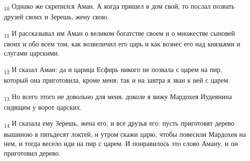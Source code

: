 \begin{tcolorbox}
\textsubscript{10} Однако же скрепился Аман. А когда пришел в дом свой, то послал позвать друзей своих и Зерешь, жену свою.
\end{tcolorbox}
\begin{tcolorbox}
\textsubscript{11} И рассказывал им Аман о великом богатстве своем и о множестве сыновей своих и обо всем том, как возвеличил его царь и как вознес его над князьями и слугами царскими.
\end{tcolorbox}
\begin{tcolorbox}
\textsubscript{12} И сказал Аман: да и царица Есфирь никого не позвала с царем на пир, который она приготовила, кроме меня; так и на завтра я зван к ней с царем.
\end{tcolorbox}
\begin{tcolorbox}
\textsubscript{13} Но всего этого не довольно для меня, доколе я вижу Мардохея Иудеянина сидящим у ворот царских.
\end{tcolorbox}
\begin{tcolorbox}
\textsubscript{14} И сказала ему Зерешь, жена его, и все друзья его: пусть приготовят дерево вышиною в пятьдесят локтей, и утром скажи царю, чтобы повесили Мардохея на нем, и тогда весело иди на пир с царем. И понравилось это слово Аману, и он приготовил дерево.
\end{tcolorbox}
